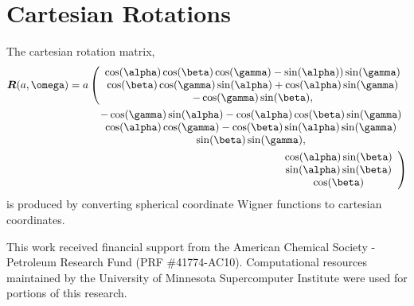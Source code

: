 \documentclass[preprint]{iucr}              %
\newcommand{\mb}[1]{\ensuremath{\mbox{\boldmath $ #1 $}}}
\begin{document}

\appendix

\section{Cartesian Rotations}
\label{cartRot}

The cartesian rotation matrix,
\begin{eqnarray}
\mb{R}(a,\mb{\omega})=a\left(\begin{array}{c}\cos(\alpha)\cos(\beta)\cos(\gamma)
- \sin(\alpha))\sin(\gamma) \\
\cos(\beta)\cos(\gamma)\sin(\alpha) + \cos(\alpha)\sin(\gamma) \\
    -\cos(\gamma) \sin(\beta),\end{array} \right. \nonumber\\
%
\begin{array}{c}-\cos(\gamma)\sin(\alpha)-\cos(\alpha) \cos(\beta) \sin(\gamma)\\
\cos(\alpha)\cos(\gamma) - \cos(\beta)\sin(\alpha)\sin(\gamma) \\
    \sin(\beta) \sin(\gamma),\end{array} \nonumber\\
%
\left. \begin{array}{c}\cos(\alpha) \sin(\beta)\\
\sin(\alpha) \sin(\beta)\\
    \cos(\beta)\end{array}\right)
\end{eqnarray}
is produced by converting spherical coordinate Wigner functions to
cartesian coordinates.





This work received financial support from the American Chemical
Society - Petroleum Research Fund (PRF \#41774-AC10).
%
Computational resources maintained by the University of Minnesota
Supercomputer Institute were used for portions of this research.
\end{document}
